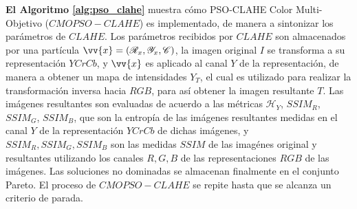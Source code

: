                 \textbf {El Algoritmo \ref{alg:pso_clahe}} muestra cómo PSO-CLAHE Color Multi-Objetivo ($CMOPSO-CLAHE$) es implementado, de manera a sintonizar los parámetros de $CLAHE$. Los parámetros recibidos por $CLAHE$ son almacenados por una partícula $\vv{x}=(\mathscr{R}_x,\mathscr{Y}_x,\mathscr{C})$, la imagen original $I$ se transforma a su representación $YCrCb$, y $\vv{x}$ es aplicado al canal $Y$ de la representación, de manera a obtener un mapa de intensidades $Y_T$, el cual es utilizado para realizar la transformación inversa hacia $RGB$, para así obtener la imagen resultante $T$. Las imágenes resultantes son evaluadas de acuerdo a las métricas $\mathscr{H}_Y$, $SSIM_R$, $SSIM_G$, $SSIM_B$, que son la entropía de las imágenes resultantes medidas en el canal $Y$ de la representación $YCrCb$ de dichas imágenes, y $SSIM_R,SSIM_G,SSIM_B$ son las medidas $SSIM$ de las imagénes original y resultantes utilizando los canales $R,G,B$ de las representaciones $RGB$ de las imágenes. Las soluciones no dominadas se almacenan finalmente en el conjunto Pareto. El proceso de $CMOPSO-CLAHE$ se repite hasta que se alcanza un criterio de parada. 



